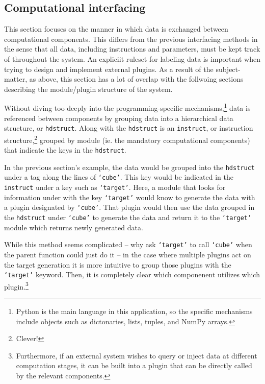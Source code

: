 \documentclass{article}
\numberwithin{equation}{section}
\begin{document}
    \subsection{Computational interfacing} \label{intfcomp}

        This section focuses on the manner in which data is exchanged between computational components.
        This differs from the previous interfacing methods in the sense that all data, including instructions and
        parameters, must be kept track of throughout the system.
        An expliciit ruleset for labeling data is important when trying to design and implement external plugins.
        As a result of the subject-matter, as above, this section has a lot of overlap with the follwoing sections
        describing the module/plugin structure of the system.

        Without diving too deeply into the programming-specific mechanisms,\footnote{
            Python is the main language in this application, so the specific mechanisms include objects such as
            dictonaries, lists, tuples, and NumPy arrays.
        } data is referenced between components by grouping data into a hierarchical data structure, or 
        \texttt{hdstruct}.
        Along with the \texttt{hdstruct} is an \texttt{instruct}, or instruction structure,\footnote{Clever!} 
        grouped by module (ie. the mandatory computational components) that indicate the keys in the 
        \texttt{hdstruct}.

        In the previous section's example, the data would be grouped into the \texttt{hdstruct} under a tag along 
        the lines of \texttt{`cube'}.
        This key would be indicated in the \texttt{instruct} under a key such as \texttt{`target'}.
        Here, a module that looks for information under with the key \texttt{`target'} would know to generate the
        data with a plugin designated by \texttt{`cube'}.
        That plugin would then use the data grouped in the \texttt{hdstruct} under \texttt{`cube'} to generate
        the data and return it to the \texttt{`target'} module which returns newly generated data.

        While this method seems complicated -- why ask \texttt{`target'} to call \texttt{`cube'} when the parent
        function could just do it -- in the case where multiple plugins act on the target generation it is more
        intuitive to group those plugins with the \texttt{`target'} keyword.
        Then, it is completely clear which componenent utilizes which plugin.\footnote{
            Furthermore, if an external system wishes to query or inject data at different computation stages, it
            can be built into a plugin that can be directly called by the relevant components.
        }
\end{document}
